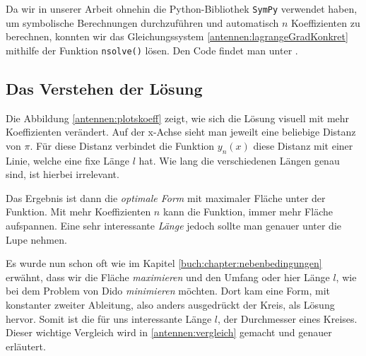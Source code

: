 Da wir in unserer Arbeit ohnehin die Python-Bibliothek \texttt{SymPy} verwendet haben, 
um symbolische Berechnungen durchzuführen und automatisch $n$ Koeffizienten zu berechnen, 
konnten wir das Gleichungssystem \eqref{antennen:lagrangeGradKonkret} mithilfe der Funktion 
\texttt{nsolve()} lösen.
Den Code findet man unter \cite{antennen:codeKoeff}.

\subsection{Das Verstehen der Lösung\label{antennen:auswertung}}

Die Abbildung \ref{antennen:plotskoeff} zeigt, wie sich die Lösung visuell mit mehr 
Koeffizienten verändert. Auf der x-Achse sieht man jeweilt eine beliebige Distanz von \emph{$\pi$}.
Für diese Distanz verbindet die Funktion $y_n(x)$ diese Distanz mit einer Linie, welche eine
fixe Länge $l$ hat. Wie lang die verschiedenen Längen genau sind, ist hierbei irrelevant.

Das Ergebnis ist dann die \emph{optimale Form} mit
maximaler Fläche unter der Funktion. Mit mehr Koeffizienten $n$ kann die Funktion,
immer mehr Fläche aufspannen. Eine sehr interessante \emph{Länge} jedoch sollte man 
genauer unter die Lupe nehmen. 

Es wurde nun schon oft wie im Kapitel \ref{buch:chapter:nebenbedingungen}
erwähnt, dass wir die Fläche \emph{maximieren} und den Umfang oder hier Länge $l$, wie 
bei dem Problem von Dido \emph{minimieren} möchten. 
Dort kam eine Form, mit konstanter zweiter Ableitung, also anders ausgedrückt
der Kreis, als Lösung hervor. Somit ist die für uns interessante Länge $l$, der Durchmesser eines Kreises. Dieser wichtige Vergleich wird in \ref{antennen:vergleich} gemacht und genauer erläutert.

